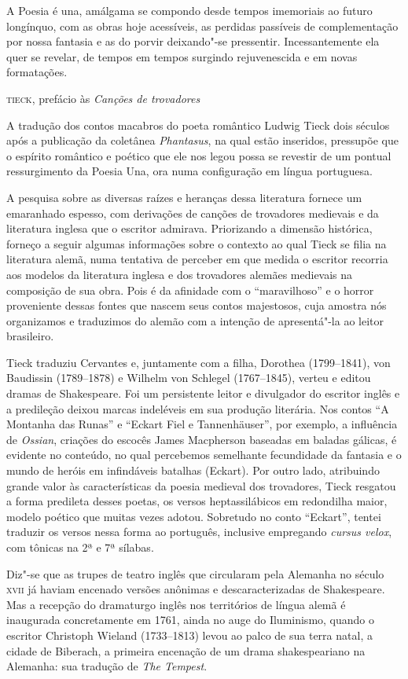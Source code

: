 \epigraph{A Poesia é una, amálgama se compondo desde tempos imemoriais
ao futuro longínquo, com as obras hoje acessíveis, as perdidas passíveis
de complementação por nossa fantasia e as do porvir deixando"-se pressentir. 
Incessantemente ela quer se revelar, de tempos em tempos surgindo rejuvenescida 
e em novas formatações.}{\textsc{tieck}, prefácio às \textit{Canções de trovadores}}

A tradução dos contos macabros do poeta romântico Ludwig Tieck dois
séculos após a publicação da coletânea \textit{Phantasus}, na qual estão
inseridos, pressupõe que o espírito romântico e poético que ele nos 
legou possa se revestir de um pontual ressurgimento da
Poesia Una, ora numa configuração em língua portuguesa. 

A pesquisa sobre as diversas raízes e heranças dessa literatura fornece
um emaranhado espesso, com derivações de canções de trovadores
medievais e da literatura inglesa que o escritor admirava. Priorizando
a dimensão histórica, forneço a seguir algumas informações sobre o
contexto ao qual Tieck se filia na literatura alemã, numa
tentativa de perceber em que medida o escritor recorria aos modelos da
literatura inglesa e dos trovadores alemães medievais na composição de
sua obra. Pois é da afinidade com o ``maravilhoso'' e o horror
proveniente dessas fontes que nascem seus contos majestosos, cuja
amostra nós organizamos e traduzimos do alemão com a intenção de
apresentá"-la ao leitor brasileiro. 

Tieck traduziu Cervantes e, juntamente com a filha, Dorothea (1799--1841), 
von Baudissin (1789--1878) e Wilhelm von Schlegel (1767--1845), 
verteu e editou dramas de Shakespeare. Foi um persistente leitor e
divulgador do escritor inglês e a predileção deixou marcas indeléveis
em sua produção literária. Nos contos ``A Montanha das Runas'' e ``Eckart
Fiel e Tannenhäuser'', por exemplo, a influência de \textit{Ossian},
criações do escocês James Macpherson baseadas em baladas gálicas, é
evidente no conteúdo, no qual percebemos semelhante fecundidade da
fantasia e o mundo de heróis em infindáveis batalhas (Eckart). Por
outro lado, atribuindo grande valor às características da poesia
medieval dos trovadores, Tieck resgatou a forma predileta desses poetas,
os versos heptassilábicos em redondilha maior, modelo poético que
muitas vezes adotou. Sobretudo no conto ``Eckart'', tentei traduzir 
os versos nessa forma ao português, inclusive
empregando \textit{cursus velox}, com tônicas na 2ª e 7ª sílabas.

Diz"-se que as trupes de teatro inglês que circularam pela Alemanha no
século \textsc{xvii} já haviam encenado versões anônimas e descaracterizadas de
Shakespeare. Mas a recepção do dramaturgo inglês nos territórios de
língua alemã é inaugurada concretamente em 1761, ainda no auge do
Iluminismo, quando o escritor Christoph Wieland (1733--1813) levou ao
palco de sua terra natal, a cidade de Biberach, a primeira encenação de um
drama shakespeariano na Alemanha: sua tradução de \textit{The Tempest}. 

